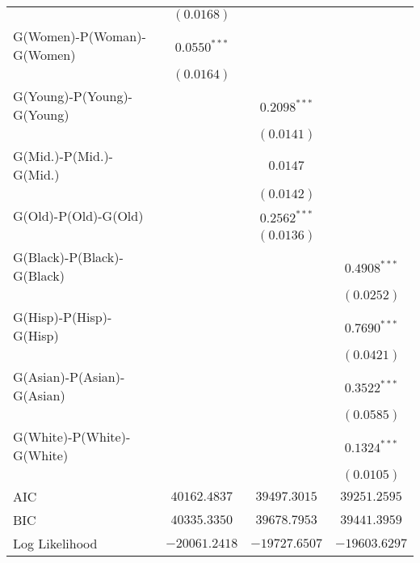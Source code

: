 \begin{center}
\begin{longtable}{l c c c}
                           & $(0.0168)$     &                 &                 \\
G(Women)-P(Woman)-G(Women) & $0.0550^{***}$ &                 &                 \\
                           & $(0.0164)$     &                 &                 \\
G(Young)-P(Young)-G(Young) &                & $0.2098^{***}$  &                 \\
                           &                & $(0.0141)$      &                 \\
G(Mid.)-P(Mid.)-G(Mid.)    &                & $0.0147$        &                 \\
                           &                & $(0.0142)$      &                 \\
G(Old)-P(Old)-G(Old)       &                & $0.2562^{***}$  &                 \\
                           &                & $(0.0136)$      &                 \\
G(Black)-P(Black)-G(Black) &                &                 & $0.4908^{***}$  \\
                           &                &                 & $(0.0252)$      \\
G(Hisp)-P(Hisp)-G(Hisp)    &                &                 & $0.7690^{***}$  \\
                           &                &                 & $(0.0421)$      \\
G(Asian)-P(Asian)-G(Asian) &                &                 & $0.3522^{***}$  \\
                           &                &                 & $(0.0585)$      \\
G(White)-P(White)-G(White) &                &                 & $0.1324^{***}$  \\
                           &                &                 & $(0.0105)$      \\
\midrule
AIC                        & $40162.4837$   & $39497.3015$    & $39251.2595$    \\
BIC                        & $40335.3350$   & $39678.7953$    & $39441.3959$    \\
Log Likelihood             & $-20061.2418$  & $-19727.6507$   & $-19603.6297$   \\
\end{longtable}
\end{center}
